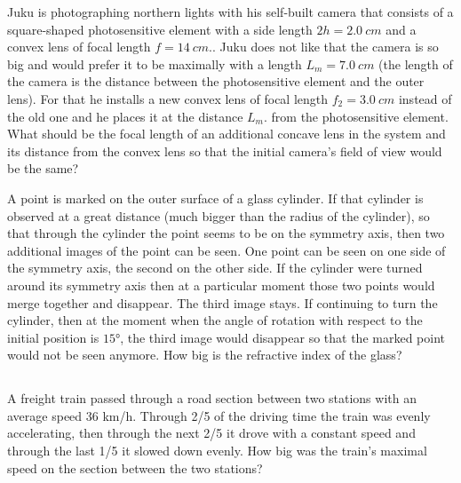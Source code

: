 \documentclass[11pt]{article}
\begin{document}

\probeng
Juku is photographing northern lights with his self-built camera that consists of a square-shaped photosensitive element with a side length $2h=\SI{2.0}{cm}$ and a convex lens of focal length $f=\SI{14}{cm}.$. Juku does not like that the camera is so big and would prefer it to be maximally with a length $L_{m}=\SI{7.0}{cm}$ (the length of the camera is the distance between the photosensitive element and the outer lens). For that he installs a new convex lens of focal length $f_{2}=\SI{3.0}{cm}$ instead of the old one and he places it at the distance $L_{m}.$ from the photosensitive element. What should be the focal length of an additional concave lens in the system and its distance from the convex lens so that the initial camera’s field of view would be the same?
\probend
\bigskip


\probeng
A point is marked on the outer surface of a glass cylinder. If that cylinder is observed at a great distance (much bigger than the radius of the cylinder), so that through the cylinder the point seems to be on the symmetry axis, then two additional images of the point can be seen. One point can be seen on one side of the symmetry axis, the second on the other side. If the cylinder were turned around its symmetry axis then at a particular moment those two points would merge together and disappear. The third image stays. If continuing to turn the cylinder, then at the moment when the angle of rotation with respect to the initial position is $\ang{15}$, the third image would disappear so that the marked point would not be seen anymore. How big is the refractive index of the glass?
\probend
\bigskip
\newpage\subsection{\protect{}}


\probeng
A freight train passed through a road section between two stations with an average speed 36 km/h. Through 2/5 of the driving time the train was evenly accelerating, then through the next 2/5 it drove with a constant speed and through the last 1/5 it slowed down evenly. How big was the train’s maximal speed on the section between the two stations?
\probend
\bigskip
\end{document}
